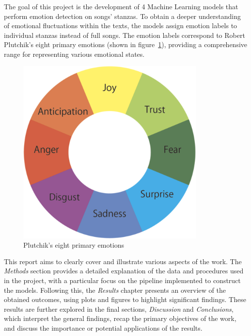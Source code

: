 The goal of this project is the development of 4 Machine Learning models
that perform emotion detection on songs' stanzas. To obtain a deeper
understanding of emotional fluctuations within the texts, the models assign
emotion labels to individual stanzas instead of full songs.
The emotion labels correspond to Robert Plutchik's eight primary emotions (shown in figure~\ref{fig:primary_emotions}), providing a comprehensive range for representing various emotional states.\\
\begin{figure}[H]
    \centering
    \includegraphics[scale= 0.30]{pictures/plutchik_primary_emotions.png}
    \caption{Plutchik's eight primary emotions}
    \label{fig:primary_emotions}
\end{figure}

This report aims to clearly cover and illustrate various aspects of the work. 
The \textit{Methods} section provides a detailed explanation of the data and procedures used in the project, with a particular focus on the pipeline implemented to construct the models. 
Following this, the \textit{Results} chapter presents an overview of the obtained outcomes, using plots and figures to highlight significant findings. 
These results are further explored in the final sections, \textit{Discussion} and \textit{Conclusions}, which interpret the general findings, recap the primary objectives of the work, and discuss the importance or potential applications of the results.


